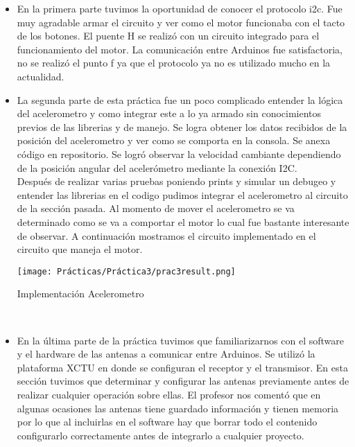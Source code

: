 \documentclass[conference]{IEEEtran}
\begin{document}
\begin{itemize}
    \item En la primera parte tuvimos la oportunidad de conocer el protocolo i2c. Fue muy agradable armar el circuito y ver como el motor funcionaba con el tacto de los botones. El puente H se realizó con un circuito integrado para el funcionamiento del motor. La comunicación entre Arduinos fue satisfactoria, no se realizó el punto f ya que el protocolo ya no es utilizado mucho en la actualidad.\\
    \item La segunda parte de esta práctica fue un poco complicado entender la lógica del acelerometro y como integrar este a lo ya armado sin conocimientos previos de las librerias y de manejo.
    Se logra obtener los datos recibidos de la posición del acelerometro y ver como se comporta en la consola. Se anexa código en repositorio. Se logró observar la velocidad cambiante  dependiendo de la posición angular del acelerómetro mediante la conexión I2C.\\ Después de realizar varias pruebas poniendo prints y simular un debugeo y entender las librerias en el codigo pudimos integrar el acelerometro al circuito de la sección pasada. Al momento de mover el acelerometro se va determinado como se va a comportar el motor lo cual fue bastante interesante de observar. A continuación mostramos el circuito implementado en el circuito que maneja el motor.\\
    
    \begin{center}
    \texttt{[image: Prácticas/Práctica3/prac3result.png]}
    \caption{Implementación Acelerometro}
    \label{fig}
    \end{center}\\

    \item En la última parte de la práctica tuvimos que familiarizarnos con el software y el hardware de las antenas a comunicar entre Arduinos. Se utilizó la plataforma XCTU en donde se configuran el receptor y el transmisor. En esta sección tuvimos que determinar y configurar las antenas previamente antes de realizar cualquier operación sobre ellas. El profesor nos comentó que en algunas ocasiones las antenas tiene guardado información y tienen memoria por lo que al incluirlas en el software hay que borrar todo el contenido configurarlo correctamente antes de integrarlo a cualquier proyecto.\\
    

\end{itemize}
\end{document}
